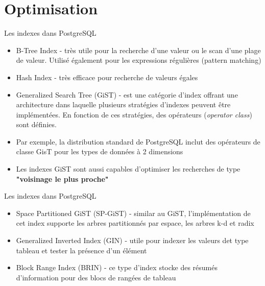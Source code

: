 
\section{Optimisation}


\begin{frame}[fragile]{Les indexes dans PostgreSQL}


   \begin{itemize}
      \item B-Tree Index - très utile pour la recherche d'une valeur ou le scan d'une plage de valeur. Utilisé également pour les expressions régulières (pattern matching)
      \item Hash Index - très efficace pour recherche de valeurs égales
      \item Generalized Search Tree (GiST) - est une catégorie d'index offrant une architecture dans laquelle plusieurs stratégies d'indexes peuvent être implémentées. En fonction de ces stratégies, des opérateurs (\textit{operator class}) sont définies.
      \item Par exemple, la distribution standard de PostgreSQL inclut des opérateurs de classe GisT pour les types de données à 2 dimensions
      \item Les indexes GiST sont aussi capables d'optimiser les recherches de type \textbf{"voisinage le plus proche"}
   \end{itemize}

\begin{toile}
\end{toile}

\end{frame}


\begin{frame}[fragile]{Les indexes dans PostgreSQL}


   \begin{itemize}
      \item Space Partitioned GiST (SP-GiST) - similar au GiST, l'implémentation de cet index supporte les arbres partitionnés par espace, les arbres k-d et radix
      \item Generalized Inverted Index (GIN) - utile pour indexer les valeurs det type tableau et tester la présence d'un élément
      \item Block Range Index (BRIN) - ce type d'index stocke des résumés d'information pour des blocs de rangées de tableau
   \end{itemize}

\begin{toile}
\end{toile}

\end{frame}

